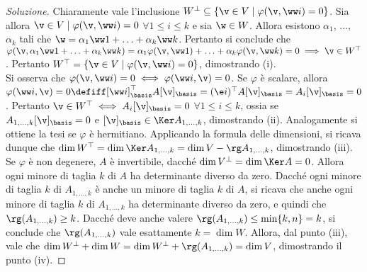 \documentclass[11pt]{article}
\begin{document}
	\begin{proof}[Soluzione]
		Chiaramente vale l'inclusione $W^\perp \subseteq \{ \v \in V \mid \varphi(\v, \ww i) = 0 \}$. Sia
		allora $\v \in V \mid \varphi(\v, \ww i) = 0$ $\forall 1 \leq i \leq k$ e sia $\w \in W$. Allora esistono $\alpha_1$, ..., $\alpha_k$ tali
		che $\w = \alpha_1 \ww 1 + \ldots + \alpha_k \ww k$. Pertanto si conclude che $\varphi(\v, \alpha_1 \ww 1 + \ldots + \alpha_k \ww k) = \alpha_1 \varphi(\v, \ww 1) + \ldots + \alpha_k \varphi(\v, \ww k) = 0 \implies \v \in W^\top$. Pertanto $W^\top = \{ \v \in V \mid \varphi(\v, \ww i) = 0 \}$, dimostrando (i). \\
		
		Si osserva che $\varphi(\v, \ww i) = 0 \iff \varphi(\ww i, \v) = 0$. Se $\varphi$ è scalare, allora
		$\varphi(\ww i, \v) = 0 \defiff [\ww i]_\basis^\top A [\v]_\basis = (\e i)^\top A [\v]_\basis = A_i [\v]_\basis = 0$. Pertanto $\v \in W^\top \iff A_i [\v]_\basis = 0$ $\forall 1 \leq i \leq k$, ossia se
		$A_{1, \ldots, k} [\v]_\basis = 0$ e $[\v]_\basis \in \Ker A_{1, \ldots, k}$, dimostrando (ii). Analogamente
		si ottiene la tesi se $\varphi$ è hermitiano.
		Applicando la formula delle dimensioni, si ricava dunque che $\dim W^\top = \dim \Ker A_{1, \ldots, k} =
		\dim V - \rg A_{1, \ldots, k}$, dimostrando (iii). \\
		
		Se $\varphi$ è non degenere, $A$ è invertibile, dacché $\dim V^\perp = \dim \Ker A = 0$. Allora
		ogni minore di taglia $k$ di $A$ ha determinante diverso da zero. Dacché ogni minore di taglia $k$
		di $A_{1,\ldots,k}$ è anche un minore di taglia $k$ di $A$, si ricava che anche ogni minore di taglia
		$k$ di $A_{1, \ldots, k}$ ha determinante diverso da zero, e quindi che $\rg(A_{1,\ldots,k}) \geq k$.
		Dacché deve anche valere $\rg(A_{1,\ldots,k}) \leq \min\{k,n\} = k$, si conclude che $\rg(A_{1,\ldots,k})$
		vale esattamente $k = \dim W$. Allora, dal punto (iii), vale che $\dim W^\perp + \dim W = \dim W^\perp + \rg(A_{1,\ldots,k}) = \dim V$, dimostrando il punto (iv).
	\end{proof}
	
\end{document}
